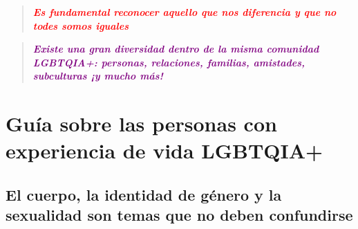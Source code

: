 \documentclass[12pt,openany]{book}
\begin{document}
\begin{quote}
\centering
\textit{\Large \textcolor{red}{\textbf{Es fundamental reconocer aquello que nos diferencia y que no todes somos iguales}}}
\end{quote}

\newpage
\thispagestyle{empty}
\begin{quote}
\centering
\doublespacing
\textit{\Large \textcolor{purple}{\textbf{Existe una gran diversidad dentro de la misma comunidad LGBTQIA+: personas, relaciones, familias, amistades, subculturas ¡y mucho más!}}}
\end{quote}

\begin{figure}[h]
    \centering
\end{figure}

\chapter*{Guía sobre las personas con experiencia de vida LGBTQIA+}

\section*{El cuerpo, la identidad de género y la sexualidad son temas que no deben confundirse}
\end{document}
